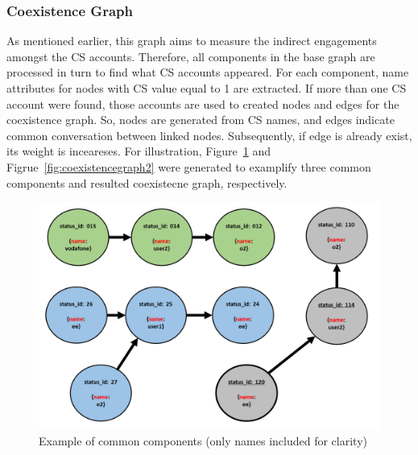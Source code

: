 \documentclass[sigconf]{acmart}
\begin{document}
{\subsubsection{Coexistence Graph}

As mentioned earlier, this graph aims to measure the indirect 
engagements amongst the CS accounts. Therefore, all components in the base
graph are processed in turn to find what CS accounts appeared. For each component,
name attributes for nodes with CS value equal to 1 are extracted. 
If more than one CS account were found, those accounts are used to created nodes
and edges for the coexistence graph. So, nodes are generated from CS names,
and edges indicate common conversation between linked nodes. Subsequently, 
if edge is already exist, its weight is inceareses. 
For illustration, Figure~\ref{fig:ccmethod} and Figrue~\ref{fig:coexistencegraph2} 
were generated to examplify three common components and 
resulted coexistecne graph, respectively.

\begin{figure}[htb]
\centering
\includegraphics[width=\columnwidth]{images/ccmethod.png}
\caption{Example of common components (only names included for clarity)}
\label{fig:ccmethod}
\end{figure}

}
\end{document}
